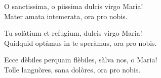 
\strofa O sanctissima, o piissima dulcis virgo Maria!\\
Mater amata intemerata, ora pro nobis.

\spazio

\strofa Tu solàtium et refugium, dulcis virgo Maria!\\
Quidquid optàmus in te speràmus, ora pro nobis.

\spazio

\strofa Ecce dèbiles perquam flèbiles, sàlva nos, o Maria!\\
Tolle languòres, sana dolòres, ora pro nobis.